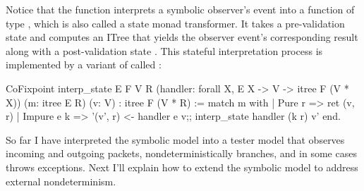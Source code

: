 Notice that the  function interprets a symbolic observer's event
 into a function of type , which is
also called a state monad transformer.  It takes a pre-validation state  and computes an ITree that yields the observer event's corresponding result
 along with a post-validation state .  This stateful
interpretation process is implemented by a variant of  called
:
\begin{coq}
  CoFixpoint interp_state {E F V R}
                          (handler: forall {X}, E X -> V -> itree F (V * X))
                          (m: itree E R) (v: V)
             : itree F (V * R) :=
    match m with
    | Pure   r   => ret (v, r)
    | Impure e k => '(v', r) <- handler e v;;
                    interp_state handler (k r) v'
    end.
\end{coq}

So far I have interpreted the symbolic model into a tester model that observes
incoming and outgoing packets, nondeterministically branches, and in some cases
throws exceptions.  Next I'll explain how to extend the symbolic model to
address external nondeterminism.
